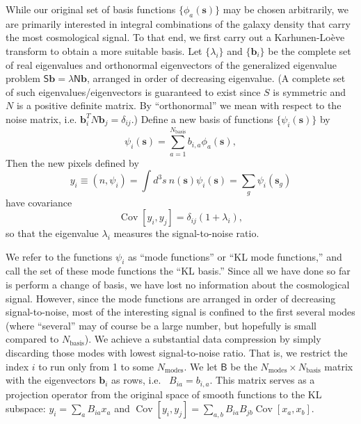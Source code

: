 \documentclass{article}
\renewcommand{\vec}[1]{\bm{#1}}
\newcommand{\mat}[1]{\textsf{#1}}
\DeclareMathOperator{\Cov}{Cov}
\begin{document}
While our original set of basis functions $\{\phi_a(\vec{s})\}$ may be chosen
arbitrarily, we are primarily interested in integral combinations of the galaxy
density that carry the most cosmological signal.  To that end, we first carry
out a Karhunen-Lo\`{e}ve transform to obtain a more suitable basis.  Let
$\{\lambda_i\}$ and $\{\vec{b}_i\}$ be the complete set of real eigenvalues and
orthonormal eigenvectors of the generalized eigenvalue problem $\mat{S} \vec{b}
= \lambda \mat{N} \vec{b}$, arranged in order of decreasing eigenvalue.  (A
complete set of such eigenvalues/eigenvectors is guaranteed to exist since $S$
is symmetric and $N$ is a positive definite matrix.  By ``orthonormal'' we mean
with respect to the noise matrix, i.e. $\vec{b}_i^T N \vec{b}_j =
\delta_{ij}$.)  Define a new basis of functions $\{\psi_i(\vec{s})\}$ by
\begin{equation}
    \psi_i(\vec{s}) = \sum_{a=1}^{N_\text{basis}} b_{i,a} \phi_a(\vec{s}),
\end{equation}
Then the new pixels defined by
\begin{equation}
    y_i \equiv (n, \psi_i) = \int d^3s~ n(\vec{s}) \psi_i(\vec{s}) = \sum_g \psi_i(\vec{s}_g)
\end{equation}
have covariance
\begin{equation}
    \Cov[y_i,y_j] = \delta_{ij} (1 + \lambda_i),
\end{equation}
so that the eigenvalue $\lambda_i$ measures the signal-to-noise ratio.

We refer to the functions $\psi_i$ as ``mode functions'' or ``KL mode
functions,'' and call the set of these mode functions the ``KL basis.'' Since
all we have done so far is perform a change of basis, we have lost no
information about the cosmological signal.  However, since the mode functions
are arranged in order of decreasing signal-to-noise, most of the interesting
signal is confined to the first several modes (where ``several'' may of course
be a large number, but hopefully is small compared to $N_\text{basis}$).  We
achieve a substantial data compression by simply discarding those modes with
lowest signal-to-noise ratio.  That is, we restrict the index $i$ to run only
from 1 to some $N_\text{modes}$.  We let $\mat{B}$ be the $N_\text{modes}
\times N_\text{basis}$ matrix with the eigenvectors $\vec{b}_i$ as rows, i.e.~
$B_{ia} = b_{i,a}$.  This matrix serves as a projection operator from the
original space of smooth functions to the KL subspace: 
$y_i = \sum_a B_{ia} x_a$ and $\Cov[y_i,y_j] = \sum_{a,b} B_{ia} B_{jb} \Cov[x_a,x_b]$.
\end{document}
